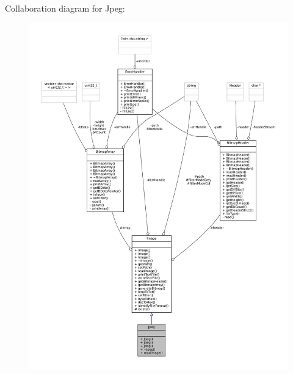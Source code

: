 Collaboration diagram for Jpeg\+:
\nopagebreak
\begin{figure}[H]
\begin{center}
\leavevmode
\includegraphics[width=350pt]{classJpeg__coll__graph}
\end{center}
\end{figure}
